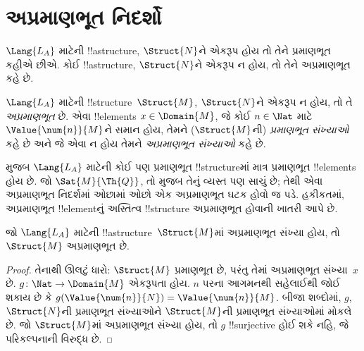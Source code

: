 \documentclass[../../../include/open-logic-section]{subfiles}
\begin{document}
\section{અપ્રમાણભૂત નિદર્શો}

\begin{explain}
$\Lang{L_A}$ માટેની !!a{structure}, $\Struct{N}$ને એકરૂપ હોય તો તેને
પ્રમાણભૂત કહીએ છીએ. કોઈ !!a{structure}, $\Struct{N}$ને એકરૂપ ન હોય,
તો તેને અપ્રમાણભૂત કહે છે.
\end{explain}

\begin{defn}
$\Lang{L_A}$ માટેની !!{structure}~$\Struct{M}$, $\Struct{N}$ને એકરૂપ
ન હોય, તો તે \emph{અપ્રમાણભૂત} છે. એવા
!!{element}s $x\in\Domain{M}$, જે કોઈ $n\in\Nat$ માટે
$\Value{\num{n}}{M}$ને સમાન હોય, તેમને ($\Struct{M}$ની)
\emph{પ્રમાણભૂત સંખ્યાઓ} કહે છે અને જે એવા ન હોય તેમને
\emph{અપ્રમાણભૂત સંખ્યાઓ} કહે છે.
\end{defn}

\begin{explain}
 મુજબ $\Lang{L_A}$ માટેની કોઈ પણ
પ્રમાણભૂત !!{structure}માં માત્ર પ્રમાણભૂત !!{element}s હોય છે. જો
$\Sat{M}{\Th{Q}}$, તો  મુજબ તેનું
વ્યસ્ત પણ સાચું છે; તેથી એવા અપ્રમાણભૂત નિદર્શમાં ઓછામાં ઓછો એક
અપ્રમાણભૂત ઘટક હોવો જ પડે.
હકીકતમાં, અપ્રમાણભૂત !!{element}નું અસ્તિત્વ !!{structure} અપ્રમાણભૂત હોવાની
ખાતરી આપે છે.
\end{explain}

\begin{prop}
જો $\Lang{L_A}$ માટેની !!a{structure}~$\Struct{M}$માં અપ્રમાણભૂત
સંખ્યા હોય, તો $\Struct{M}$ અપ્રમાણભૂત છે.
\end{prop}

\begin{proof}
તેનાથી ઊલટું ધારો: $\Struct{M}$ પ્રમાણભૂત છે, પરંતુ તેમાં અપ્રમાણભૂત
સંખ્યા~$x$ છે. $g\colon\Nat\to\Domain{M}$ એકરૂપતા હોય. $n$ પરના
આગમનથી સહેલાઈથી જોઈ શકાય છે કે
$g(\Value{\num{n}}{N})=\Value{\num{n}}{M}$. બીજા શબ્દોમાં, $g$,
$\Struct{N}$ની પ્રમાણભૂત સંખ્યાઓને $\Struct{M}$ની પ્રમાણભૂત
સંખ્યાઓમાં મોકલે છે. જો $\Struct{M}$માં અપ્રમાણભૂત સંખ્યા હોય, તો
$g$ !!{surjective} હોઈ શકે નહિ, જે પરિકલ્પનાની વિરુદ્ધ છે.
\end{proof}
\end{document}
